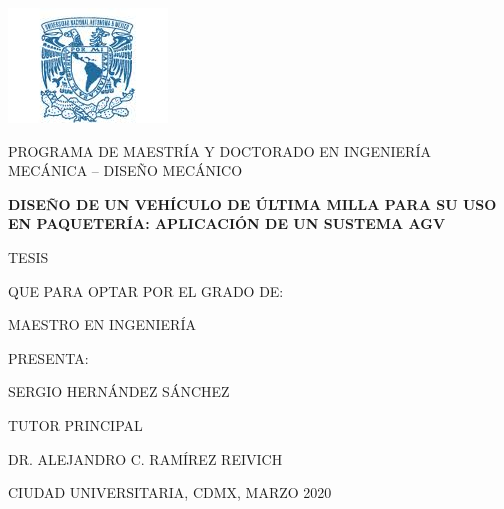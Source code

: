 \begin{center}
\includegraphics[scale=1]{Figures/Logo_azul.png}\\
\vspace*{2\baselineskip}

\textbf{\fontsize{16}{0}{\selectfont{UNIVERSIDAD NACIONAL AUTÓNOMA DE MÉXICO}}}
\vspace*{0\baselineskip}

PROGRAMA DE MAESTRÍA Y DOCTORADO EN INGENIERÍA
MECÁNICA – DISEÑO MECÁNICO

\vspace*{4\baselineskip}

\textbf{DISEÑO DE UN VEHÍCULO DE ÚLTIMA MILLA PARA SU USO EN PAQUETERÍA: APLICACIÓN DE UN SUSTEMA AGV}

\vspace*{5\baselineskip}

TESIS

QUE PARA OPTAR POR EL GRADO DE:

MAESTRO EN INGENIERÍA

\vspace*{5\baselineskip}

PRESENTA:

SERGIO HERNÁNDEZ SÁNCHEZ

\vspace*{4\baselineskip}

TUTOR PRINCIPAL

DR. ALEJANDRO C. RAMÍREZ REIVICH

\vspace*{4\baselineskip}
CIUDAD UNIVERSITARIA, CDMX, MARZO 2020

\thispagestyle{empty}

\end{center}
